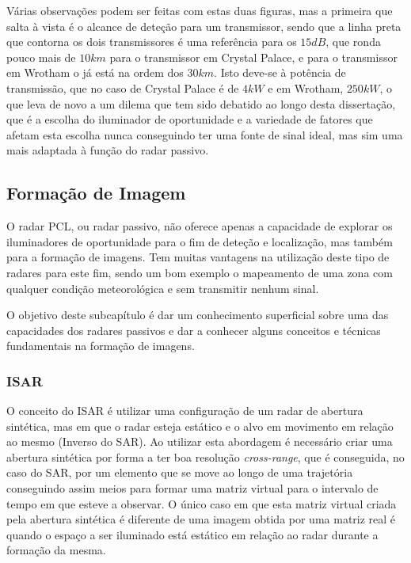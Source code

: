 Várias observações podem ser feitas com estas duas figuras, mas a primeira que salta à vista é o alcance de deteção para um transmissor, sendo que a linha preta que contorna os dois transmissores é uma referência para os $15dB$, que ronda pouco mais de $10km$ para o transmissor em Crystal Palace, e para o transmissor em Wrotham o já está na ordem dos $30km$. Isto deve-se à potência de transmissão, que no caso de Crystal Palace é de $4kW$ e em Wrotham, $250kW$, o que leva de novo a um dilema que tem sido debatido ao longo desta dissertação, que é a escolha do iluminador de oportunidade e a variedade de fatores que afetam esta escolha nunca conseguindo ter uma fonte de sinal ideal, mas sim uma mais adaptada à função do radar passivo.


\subsection{Formação de Imagem}
O radar \gls{PCL}, ou radar passivo, não oferece apenas a capacidade de explorar os iluminadores de oportunidade para o fim de deteção e localização, mas também para a formação de imagens. Tem muitas vantagens na utilização deste tipo de radares para este fim, sendo um bom exemplo o mapeamento de uma zona com qualquer condição meteorológica e sem transmitir nenhum sinal.\par 
O objetivo deste subcapítulo é dar um conhecimento superficial sobre uma das capacidades dos radares passivos e dar a conhecer alguns conceitos e técnicas fundamentais na formação de imagens.\par 

\subsubsection*{\gls{ISAR}}
O conceito do \gls{ISAR} é utilizar uma configuração de um radar de abertura sintética, mas em que o radar esteja estático e o alvo em movimento em relação ao mesmo (Inverso do \gls{SAR}). Ao utilizar esta abordagem é necessário criar uma abertura sintética por forma a ter boa resolução \textit{cross-range}, que é conseguida, no caso do \gls{SAR}, por um elemento que se move ao longo de uma trajetória conseguindo assim meios para formar uma matriz virtual para o intervalo de tempo em que esteve a observar. O único caso em que esta matriz virtual criada pela abertura sintética é diferente de uma imagem obtida por uma matriz real é quando o espaço a ser iluminado está estático em relação ao radar durante a formação da mesma.